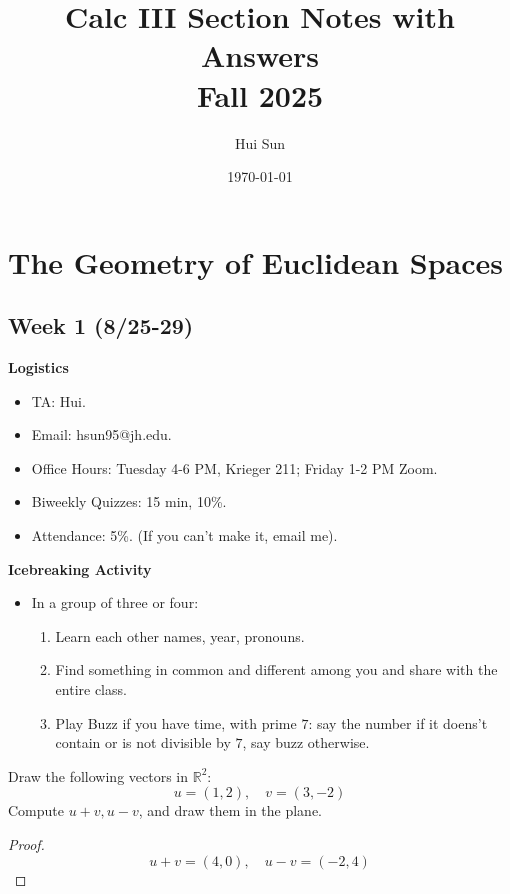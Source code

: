 \documentclass[openany]{book}
\title{Calc III Section Notes with Answers
\\ 
\vspace{0.4cm}
\large Fall 2025}
\date{\today}
\author{Hui Sun}
\newcommand{\R}{\mathbb{R}}
\begin{document}
\maketitle
\tableofcontents

\newpage

\chapter{The Geometry of Euclidean Spaces}


\section*{\centering Week 1 (8/25-29)}




\renewcommand\thesection{\arabic{section}}
\noindent
\textbf{Logistics}


\begin{itemize}
    \item TA: Hui.
    \item Email: hsun95@jh.edu.
    \item Office Hours: Tuesday 4-6 PM, Krieger 211; Friday 1-2 PM Zoom.
    \item Biweekly Quizzes: 15 min, 10\%.
    \item Attendance: 5\%. (If you can't make it, email me).
\end{itemize}

\noindent
\textbf{Icebreaking Activity}

\begin{itemize}
    \item In a group of three or four: 
    \begin{enumerate}
        \item Learn each other names, year, pronouns.
        \item Find something in common and different among you and share with the entire class.
        \item Play Buzz if you have time, with prime $7$: say the number if it doens't contain or is not divisible by $7$, say buzz otherwise.
    \end{enumerate}
\end{itemize}


\begin{prob}
    Draw the following vectors in $\R^2$:
    \begin{equation*}
        u=(1,2), \quad v=(3,-2)
    \end{equation*}
    Compute $u+v, u-v$, and draw them in the plane.
\end{prob}
\begin{proof}
    \begin{equation*}
        u+v=(4,0), \quad u-v=(-2, 4)
    \end{equation*}
\end{proof}
\end{document}
